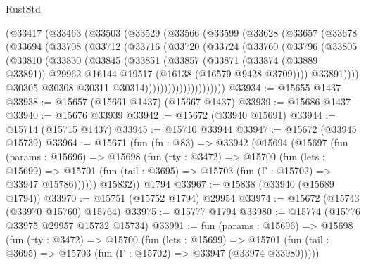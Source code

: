 \begin{lexlean}{RustStd}
\begin{coremodule}
          (@33417
            (@33463
              (@33503
                (@33529
                  (@33566
                    (@33599
                      (@33628
                        (@33657
                          (@33678
                            (@33694
                              (@33708
                                (@33712
                                  (@33716
                                    (@33720
                                      (@33724
                                        (@33760
                                          (@33796
                                            (@33805
                                              (@33810
                                                (@33830
                                                  (@33845
                                                    (@33851
                                                      (@33857
                                                        (@33871
                                                          (@33874 (@33889 @33891))
                                                          @29962
                                                          @16144
                                                          @19517
                                                          (@16138 (@16579 @9428 @3709))))
                                                      @33891))))
                                              @30305
                                              @30308
                                              @30311
                                              @30314)))))))))))))))))))))
@33934 := @15655 @1437
@33938 := @15657 (@15661 @1437) (@15667 @1437)
@33939 := @15686 @1437
@33940 := @15676 @33939
@33942 := @15672 (@33940 @15691)
@33944 := @15714 (@15715 @1437)
@33945 := @15710 @33944
@33947 := @15672 (@33945 @15739)
@33964 := @15671
    (fun (fn : @83) =>
    @33942
      (@15694
        (@15697
          (fun (params : @15696) =>
          @15698
            (fun (rty : @3472) =>
            @15700
              (fun (lets : @15699) =>
              @15701 (fun (tail : @3695) => @15703 (fun (Γ : @15702) => @33947 @15786))))))
        @15832))
    @1794
@33967 := @15838 (@33940 (@15689 @1794))
@33970 := @15751 (@15752 @1794) @29954
@33974 := @15672 (@15743 (@33970 @15760) @15764)
@33975 := @15777 @1794
@33980 := @15774 (@15776 @33975 @29957 @15732 @15734)
@33991 := fun (params : @15696) =>
  @15698
    (fun (rty : @3472) =>
    @15700
      (fun (lets : @15699) =>
      @15701 (fun (tail : @3695) => @15703 (fun (Γ : @15702) => @33947 (@33974 @33980)))))

\end{coremodule}
\end{lexlean}

